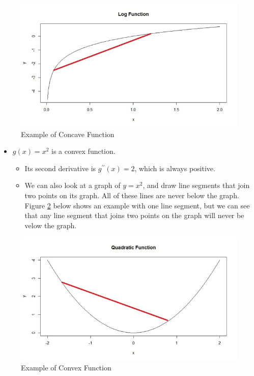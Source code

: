 \documentclass[
]{book}
\providecommand{\tightlist}{%
  \setlength{\itemsep}{0pt}\setlength{\parskip}{0pt}}
\begin{document}
\begin{figure}
\centering
\includegraphics{images/06-concave.jpeg}
\caption{\label{fig:concave}Example of Concave Function}
\end{figure}

\begin{itemize}
\tightlist
\item
  \(g(x) = x^2\) is a convex function.

  \begin{itemize}
  \tightlist
  \item
    Its second derivative is \(g^{\prime \prime}(x) = 2\), which is always positive.
  \item
    We can also look at a graph of \(y = x^2\), and draw line segments that join two points on its graph. All of these lines are never below the graph. Figure \ref{fig:convex} below shows an example with one line segment, but we can see that any line segment that joins two points on the graph will never be velow the graph.
  \end{itemize}
\end{itemize}

\begin{figure}
\centering
\includegraphics{images/06-convex.jpeg}
\caption{\label{fig:convex}Example of Convex Function}
\end{figure}
\end{document}
